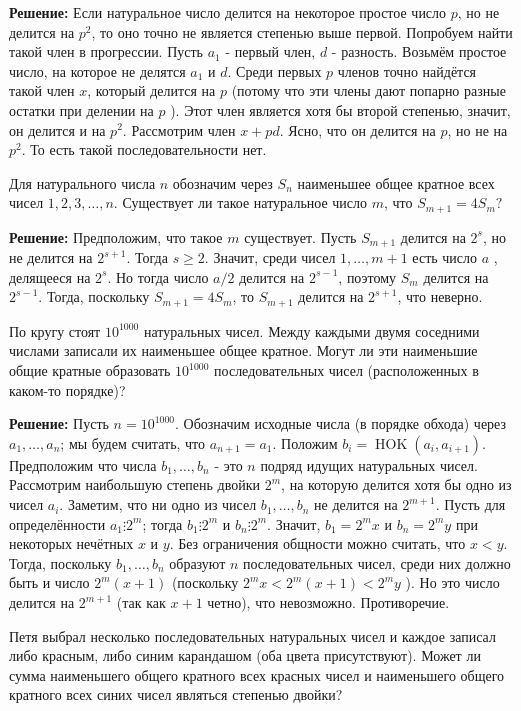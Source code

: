 \textbf{Решение:}
Если натуральное число делится на некоторое простое число $p$, но не делится на $p^2$, то оно точно не является степенью выше первой. Попробуем найти такой член в прогрессии. Пусть $a_1$ - первый член, $d$ - разность. Возьмём простое число, на которое не делятся $a_1$ и $d$. Среди первых $p$ членов точно найдётся такой член $x$, который делится на $p$ (потому что эти члены дают попарно разные остатки при делении на $p$ ). Этот член является хотя бы второй степенью, значит, он делится и на $p^2$. Рассмотрим член $x+p d$. Ясно, что он делится на $p$, но не на $p^2$. То есть такой последовательности нет.

Для натурального числа $n$ обозначим через $S_n$ наименьшее общее кратное всех чисел $1,2,3, \ldots, n$. Существует ли такое натуральное число $m$, что $S_{m+1}=4 S_m ?$

\textbf{Решение:}
Предположим, что такое $m$ существует. Пусть $S_{m+1}$ делится на $2^s$, но не делится на $2^{s+1}$. Тогда $s \geqslant 2$. Значит, среди чисел $1, \ldots, m+1$ есть число $a$ , делящееся на $2^s$. Но тогда число $a / 2$ делится на $2^{s-1}$, поэтому $S_m$ делится на $2^{s-1}$. Тогда, поскольку $S_{m+1}=4 S_m$, то $S_{m+1}$ делится на $2^{s+1}$, что неверно.

По кругу стоят $10^{1000}$ натуральных чисел. Между каждыми двумя соседними числами записали их наименьшее общее кратное. Могут ли эти наименьшие общие кратные образовать $10^{1000}$ последовательных чисел (расположенных в каком-то порядке)?

\textbf{Решение:}
Пусть $n=10^{1000}$. Обозначим исходные числа (в порядке обхода) через $a_1, \ldots, a_n$; мы будем считать, что $a_{n+1}=a_1$. Положим $b_i=\operatorname{HOK}\left(a_i, a_{i+1}\right)$. Предположим что числа $b_1, \ldots, b_n$ - это $n$ подряд идущих натуральных чисел.
Рассмотрим наибольшую степень двойки $2^m$, на которую делится хотя бы одно из чисел $a_i$. Заметим, что ни одно из чисел $b_1, \ldots, b_n$ не делится на $2^{m+1}$. Пусть для определённости $a_1 \vdots 2^m$; тогда $b_1 \vdots 2^m$ и $b_n \vdots 2^m$. Значит, $b_1=2^m x$ и $b_n=2^m y$ при некоторых нечётных $x$ и $y$. Без ограничения общности можно считать, что $x<y$. Тогда, поскольку $b_1, \ldots, b_n$ образуют $n$ последовательных чисел, среди них должно быть и число $2^m(x+1)$ (поскольку $2^m x<2^m(x+1)<2^m y$ ). Но это число делится на $2^{m+1}$ (так как $x+1$ четно), что невозможно. Противоречие.

Петя выбрал несколько последовательных натуральных чисел и каждое записал либо красным, либо синим карандашом (оба цвета присутствуют). Может ли сумма наименьшего общего кратного всех красных чисел и наименьшего общего кратного всех синих чисел являться степенью двойки?

